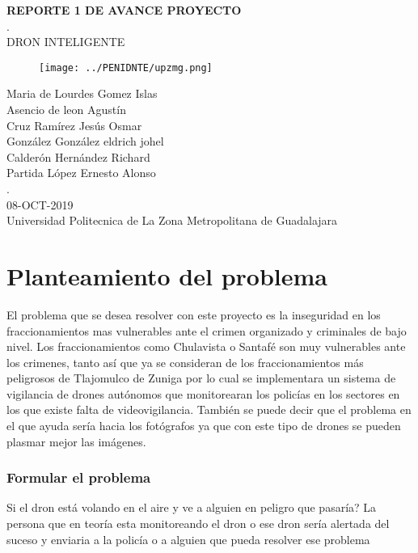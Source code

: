 \documentclass[11pt,a4paper]{article}
\begin{document}
\begin{center}
\textbf{REPORTE 1 DE AVANCE PROYECTO}\\
.\\
DRON INTELIGENTE
\end{center}

\begin{figure}[h]
\centering
\texttt{[image: ../PENIDNTE/upzmg.png]} 
\end{figure}

\begin{center}
Maria de Lourdes Gomez Islas\\
Asencio de leon Agustín\\
Cruz Ramírez Jesús Osmar\\
González González eldrich johel\\
Calderón Hernández Richard\\
Partida López Ernesto Alonso\\
.\\
08-OCT-2019\\
Universidad Politecnica de La Zona Metropolitana de Guadalajara
\end{center}

\newpage 

\part{Planteamiento del problema}
El problema que se desea resolver con este proyecto es la inseguridad en los fraccionamientos mas vulnerables ante el crimen organizado y criminales de bajo nivel.
Los fraccionamientos como Chulavista o Santafé son muy vulnerables ante los crimenes, tanto así que ya se consideran de los fraccionamientos más peligrosos de Tlajomulco de Zuniga por lo cual se implementara un sistema de vigilancia de drones autónomos que monitorearan los policías en los  sectores en los que existe  falta de videovigilancia.
También se puede decir que el problema en el que ayuda sería hacia los fotógrafos ya que con este tipo de drones se pueden plasmar mejor las imágenes.

\section{Formular el problema}
Si el dron está volando en el aire y ve a alguien en peligro que pasaría?
La persona que en teoría esta monitoreando el dron o ese dron sería alertada del suceso y enviaria a la policía o a alguien que pueda resolver ese problema
\end{document}

